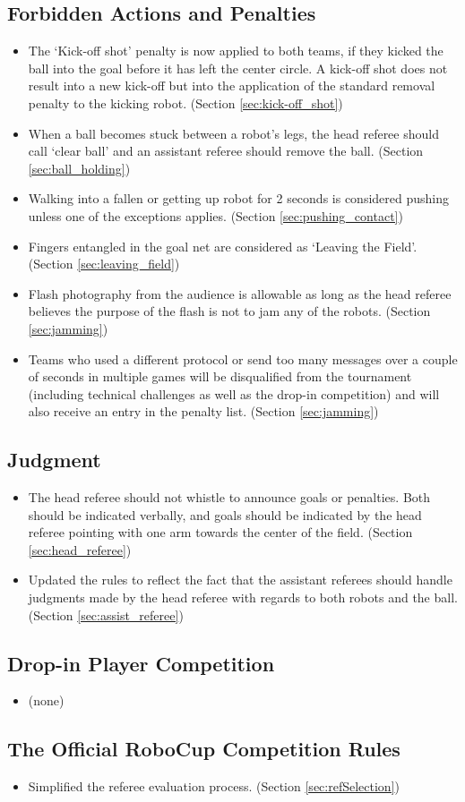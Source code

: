 \documentclass[12pt]{article}
\begin{document}
\subsection*{Forbidden Actions and Penalties}
\begin{itemize}
	\item The `Kick-off shot' penalty is now applied to both teams, if they kicked the ball into the goal before it has left the center circle. A kick-off shot does not result into a new kick-off but into the application of the standard removal penalty to the kicking robot. (Section \ref{sec:kick-off_shot})
	\item  When a ball becomes stuck between a robot's legs, the head referee should call `clear ball' and an assistant referee should remove the ball. (Section \ref{sec:ball_holding})
	\item Walking into a fallen or getting up robot for 2 seconds is considered pushing unless one of the exceptions applies. (Section \ref{sec:pushing_contact})
	\item Fingers entangled in the goal net are considered as `Leaving the Field'. (Section \ref{sec:leaving_field})
	\item Flash photography from the audience is allowable as long as the head referee believes the purpose of the flash is not to jam any of the robots. (Section \ref{sec:jamming})
	\item Teams who used a different protocol or send too many messages over a couple of seconds in multiple games will be disqualified from the tournament (including technical challenges as well as the drop-in competition) and will also receive an entry in the penalty list. (Section \ref{sec:jamming})
\end{itemize}

\subsection*{Judgment}
\begin{itemize}
	\item The head referee should not whistle to announce goals or penalties.  Both should be indicated verbally, and goals should be indicated by the head referee pointing with one arm towards the center of the field. (Section \ref{sec:head_referee})
	\item Updated the rules to reflect the fact that the assistant referees should handle judgments made by the head referee with regards to both robots and the ball. (Section \ref{sec:assist_referee})
\end{itemize}

\subsection*{Drop-in Player Competition}
\begin{itemize}	
	\item (none)
\end{itemize}

\subsection*{The Official RoboCup Competition Rules}
\begin{itemize}	
	\item Simplified the referee evaluation process. (Section \ref{sec:refSelection})
\end{itemize}
\end{document}
